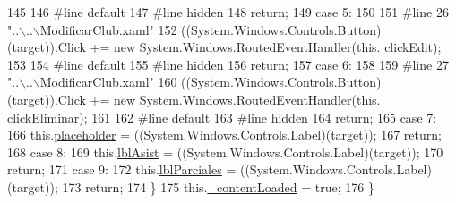 \begin{DoxyCode}
145             
146 \textcolor{preprocessor}{            #line default}
147 \textcolor{preprocessor}{}\textcolor{preprocessor}{            #line hidden}
148 \textcolor{preprocessor}{}            \textcolor{keywordflow}{return};
149             \textcolor{keywordflow}{case} 5:
150             
151 \textcolor{preprocessor}{            #line 26 "..\(\backslash\)..\(\backslash\)ModificarClub.xaml"}
152 \textcolor{preprocessor}{}            ((System.Windows.Controls.Button)(target)).Click += \textcolor{keyword}{new} System.Windows.RoutedEventHandler(\textcolor{keyword}{this}.
      clickEdit);
153             
154 \textcolor{preprocessor}{            #line default}
155 \textcolor{preprocessor}{}\textcolor{preprocessor}{            #line hidden}
156 \textcolor{preprocessor}{}            \textcolor{keywordflow}{return};
157             \textcolor{keywordflow}{case} 6:
158             
159 \textcolor{preprocessor}{            #line 27 "..\(\backslash\)..\(\backslash\)ModificarClub.xaml"}
160 \textcolor{preprocessor}{}            ((System.Windows.Controls.Button)(target)).Click += \textcolor{keyword}{new} System.Windows.RoutedEventHandler(\textcolor{keyword}{this}.
      clickEliminar);
161             
162 \textcolor{preprocessor}{            #line default}
163 \textcolor{preprocessor}{}\textcolor{preprocessor}{            #line hidden}
164 \textcolor{preprocessor}{}            \textcolor{keywordflow}{return};
165             \textcolor{keywordflow}{case} 7:
166             this.\hyperlink{class_asistencias__wpf_1_1_modificar_club_a2b2c3976252b8870397a47d96673c856}{placeholder} = ((System.Windows.Controls.Label)(target));
167             \textcolor{keywordflow}{return};
168             \textcolor{keywordflow}{case} 8:
169             this.\hyperlink{class_asistencias__wpf_1_1_modificar_club_ac5bdd9fd539f35d3f2e5fbd928913db5}{lblAsist} = ((System.Windows.Controls.Label)(target));
170             \textcolor{keywordflow}{return};
171             \textcolor{keywordflow}{case} 9:
172             this.\hyperlink{class_asistencias__wpf_1_1_modificar_club_a898ac5359d41d715dbfb86b46a84a39f}{lblParciales} = ((System.Windows.Controls.Label)(target));
173             \textcolor{keywordflow}{return};
174             \}
175             this.\hyperlink{class_asistencias__wpf_1_1_modificar_club_a1a23f498d37b0f95f283e2b650e396ba}{\_contentLoaded} = \textcolor{keyword}{true};
176         \}
\end{DoxyCode}
